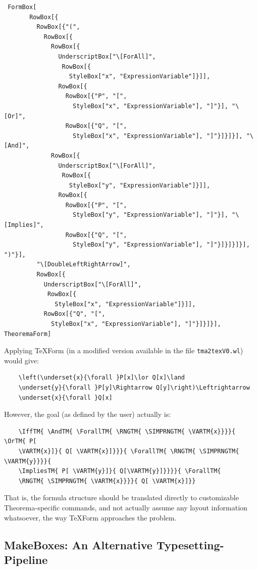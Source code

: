 \begin{verbatim}
 FormBox[
       RowBox[{
         RowBox[{"(", 
           RowBox[{
             RowBox[{
               UnderscriptBox["\[ForAll]", 
                RowBox[{
                  StyleBox["x", "ExpressionVariable"]}]], 
               RowBox[{
                 RowBox[{"P", "[", 
                   StyleBox["x", "ExpressionVariable"], "]"}], "\[Or]", 
                 RowBox[{"Q", "[", 
                   StyleBox["x", "ExpressionVariable"], "]"}]}]}], "\[And]", 
             RowBox[{
               UnderscriptBox["\[ForAll]", 
                RowBox[{
                  StyleBox["y", "ExpressionVariable"]}]], 
               RowBox[{
                 RowBox[{"P", "[", 
                   StyleBox["y", "ExpressionVariable"], "]"}], "\[Implies]", 
                 RowBox[{"Q", "[", 
                   StyleBox["y", "ExpressionVariable"], "]"}]}]}]}], ")"}], 
         "\[DoubleLeftRightArrow]", 
         RowBox[{
           UnderscriptBox["\[ForAll]", 
            RowBox[{
              StyleBox["x", "ExpressionVariable"]}]], 
           RowBox[{"Q", "[", 
             StyleBox["x", "ExpressionVariable"], "]"}]}]}], TheoremaForm]
\end{verbatim}

Applying TeXForm (in a modified version available in the file \lstinline+tma2texV0.wl+) would give:

\begin{verbatim}
    \left(\underset{x}{\forall }P[x]\lor Q[x]\land 
    \underset{y}{\forall }P[y]\Rightarrow Q[y]\right)\Leftrightarrow 
    \underset{x}{\forall }Q[x]
\end{verbatim}

However, the goal (as defined by the user) actually is:

\begin{verbatim}
    \IffTM{ \AndTM{ \ForallTM{ \RNGTM{ \SIMPRNGTM{ \VARTM{x}}}}{ \OrTM{ P[ 
    \VARTM{x}]}{ Q[ \VARTM{x}]}}}{ \ForallTM{ \RNGTM{ \SIMPRNGTM{ \VARTM{y}}}}{ 
    \ImpliesTM{ P[ \VARTM{y}]}{ Q[\VARTM{y}]}}}}{ \ForallTM{ 
    \RNGTM{ \SIMPRNGTM{ \VARTM{x}}}}{ Q[ \VARTM{x}]}}
\end{verbatim}

That is, the formula structure should be translated directly to customizable Theorema-specific commands, and not actually assume any layout information whatsoever, the way TeXForm approaches the problem.

\subsection{MakeBoxes: An Alternative Typesetting-Pipeline} \label{concept:pipeline}

